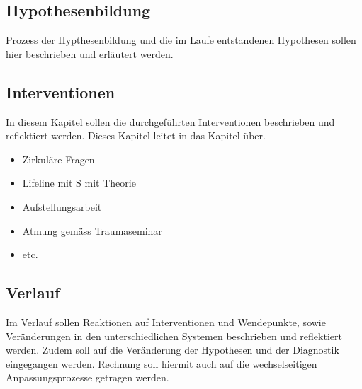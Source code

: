\subsection{Hypothesenbildung} Prozess der Hypthesenbildung und die im Laufe entstandenen Hypothesen sollen hier beschrieben und erläutert werden. 
\subsection{Interventionen} In diesem Kapitel sollen die durchgeführten Interventionen beschrieben und reflektiert werden. Dieses Kapitel leitet in das Kapitel  über.
\begin{itemize}
 \item Zirkuläre Fragen
 \item Lifeline mit S mit Theorie
 \item Aufstellungsarbeit
 \item Atmung gemäss Traumaseminar
 \item etc.
\end{itemize}
\subsection{Verlauf}\label{Verlauf} Im Verlauf sollen Reaktionen auf Interventionen und Wendepunkte, sowie Veränderungen in den unterschiedlichen Systemen beschrieben und reflektiert werden. Zudem soll auf die Veränderung der Hypothesen und der Diagnostik eingegangen werden. Rechnung soll hiermit auch auf die wechselseitigen Anpassungsprozesse getragen werden.

